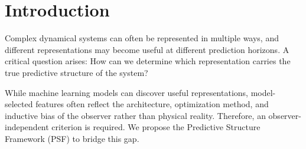 \section{Introduction}
Complex dynamical systems can often be represented in multiple ways, and different representations may become useful at different prediction horizons. A critical question arises: How can we determine which representation carries the true predictive structure of the system? 

While machine learning models can discover useful representations, model-selected features often reflect the architecture, optimization method, and inductive bias of the observer rather than physical reality. Therefore, an observer-independent criterion is required. We propose the Predictive Structure Framework (PSF) to bridge this gap.
